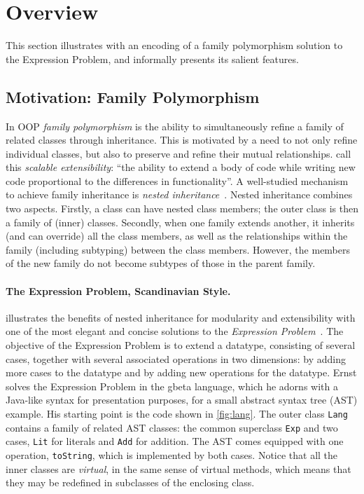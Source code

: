 
\section{Overview}
\label{nested:sec:overview}

This section illustrates \namee with an encoding of a family polymorphism
solution to the Expression Problem, and informally presents its salient
features.

\subsection{Motivation: Family Polymorphism}

In OOP \emph{family polymorphism} is the ability to
simultaneously refine a family of related classes through inheritance. This is
motivated by a need to not only refine individual classes, but also to preserve
and refine their mutual relationships. \citet{Nystrom_2004} call this
\emph{scalable extensibility}: ``the ability to extend a body of code while
writing new code proportional to the differences in functionality''.
%
A well-studied mechanism to achieve family inheritance is \emph{nested
inheritance}~\citep{Nystrom_2004}. Nested inheritance combines two aspects.
Firstly, a class can have nested class members; the outer class is then a
family of (inner) classes. Secondly, when one family extends another, it
inherits (and can override) all the class members, as well as the relationships
within the family (including subtyping) between the class members. However,
the members of the new family do not become subtypes of those in the parent family.

\paragraph{The Expression Problem, Scandinavian Style.}
\citet{Ernst_2001} illustrates the benefits of nested inheritance for modularity
and extensibility with one of the most elegant and concise solutions to the
\emph{Expression Problem}~\citep{wadler1998expression}. The objective of the
Expression Problem is to extend a datatype, consisting of several cases,
together with several associated operations in two dimensions: by adding more
cases to the datatype and by adding new operations for the datatype. Ernst
solves the Expression Problem in the gbeta language, which he adorns with a
Java-like syntax for presentation purposes, for a small abstract syntax tree
(AST) example. His starting point is the code shown in \cref{fig:lang}. The
outer class \lstinline{Lang} contains a family of related AST classes: the
common superclass \lstinline{Exp} and two cases, \lstinline{Lit} for literals
and \lstinline{Add} for addition. The AST comes equipped with one operation,
\lstinline{toString}, which is implemented by both cases. Notice that all the
inner classes are \textit{virtual}, in the same sense of virtual methods, which
means that they may be redefined in subclasses of the enclosing class.


